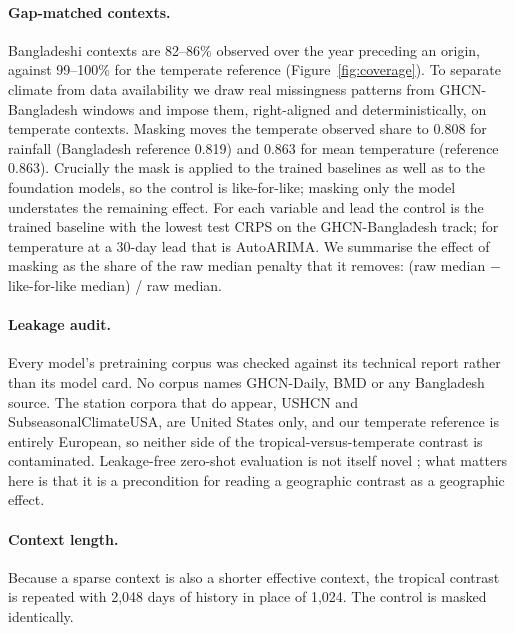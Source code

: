 \paragraph{Gap-matched contexts.} Bangladeshi contexts are 82--86\% observed over the year preceding an origin,
against 99--100\% for the temperate reference (Figure~\ref{fig:coverage}). To separate climate from data
availability we draw real missingness
patterns from GHCN-Bangladesh windows and impose them, right-aligned and deterministically, on temperate contexts.
Masking moves the temperate observed share to 0.808 for rainfall (Bangladesh reference 0.819) and 0.863 for mean
temperature (reference 0.863). Crucially the mask is applied to the trained baselines as well as to the foundation
models, so the control is like-for-like; masking only the model understates the remaining effect. For each
variable and lead the control is the trained baseline with the lowest test CRPS on the GHCN-Bangladesh track; for
temperature at a 30-day lead that is AutoARIMA. We summarise the effect of masking as the share of the raw median
penalty that it removes: (raw median $-$ like-for-like median) / raw median.

\paragraph{Leakage audit.} Every model's pretraining corpus was checked against its technical report rather than
its model card. No corpus names GHCN-Daily, BMD or any Bangladesh source. The station corpora that do appear,
USHCN and SubseasonalClimateUSA, are United States only, and our temperate reference is entirely European, so
neither side of the tropical-versus-temperate contrast is contaminated. Leakage-free zero-shot evaluation is not
itself novel \citep{qiao2026time}; what matters here is that it is a precondition for reading a geographic
contrast as a geographic effect.

\paragraph{Context length.} Because a sparse context is also a shorter effective context, the tropical contrast is
repeated with 2{,}048 days of history in place of 1{,}024. The control is masked identically.
